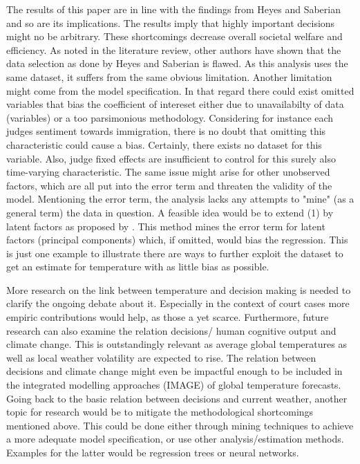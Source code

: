 \documentclass[11pt]{article}
\begin{document}
	The results of this paper are in line with the findings from Heyes and Saberian and so are its implications. The results imply that highly important decisions might no be arbitrary. These shortcomings decrease overall societal welfare and efficiency. 
	As noted in the literature review, other authors have shown that the data selection as done by Heyes and Saberian is flawed. As this analysis uses the same dataset, it suffers from the same obvious limitation. Another limitation might come from the model specification. In that regard there could exist omitted variables that bias the coefficient of intereset either due to unavailabilty of data (variables) or a too parsimonious methodology. Considering for instance each judges sentiment towards immigration, there is no doubt that omitting this characteristic could cause a bias. Certainly, there exists no dataset for this variable. Also, judge fixed effects are insufficient to control for this surely also time-varying characteristic. The same issue might arise for other unobserved factors, which are all put into the error term and threaten the validity of the model. Mentioning the error term, the analysis lacks any attempts to "mine" (as a general term) the data in question. A feasible idea would be to extend (1) by latent factors as proposed by \cite{bai2009panel}. This method mines the error term for latent factors (principal components) which, if omitted, would bias the regression. This is just one example to illustrate there are ways to further exploit the dataset to get an estimate for temperature with as little bias as possible. 
	
	More research on the link between temperature and decision making is needed to clarify the ongoing debate about it. Especially in the context of court cases more empiric contributions would help, as those a yet scarce. Furthermore, future research can also examine the relation decisions/ human cognitive output and climate change. This is outstandingly relevant as average global temperatures as well as local weather volatility are expected to rise. The relation between decisions and climate change might even be impactful enough to be included in the integrated modelling approaches (IMAGE) of global temperature forecasts. Going back to the basic relation between decisions and current weather, another topic for research would be to mitigate the methodological shortcomings mentioned above. This could be done either through mining techniques to achieve a more adequate model specification, or use other analysis/estimation methods. Examples for the latter would be regression trees or neural networks.
\end{document}
